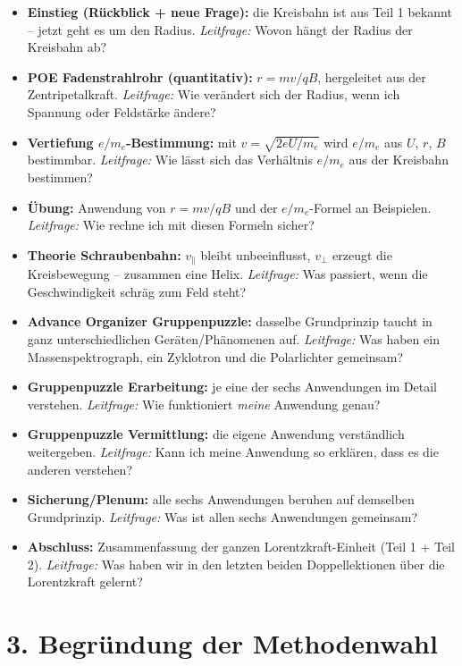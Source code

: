 \documentclass[11pt,a4paper]{article}
\begin{document}
\begin{itemize}[leftmargin=1.3cm,itemsep=0.3em]
  \item \textbf{Einstieg (Rückblick + neue Frage):} die Kreisbahn ist aus
  Teil 1 bekannt -- jetzt geht es um den Radius. \emph{Leitfrage:} Wovon
  hängt der Radius der Kreisbahn ab?
  \item \textbf{POE Fadenstrahlrohr (quantitativ):} $r=mv/qB$, hergeleitet
  aus der Zentripetalkraft. \emph{Leitfrage:} Wie verändert sich der
  Radius, wenn ich Spannung oder Feldstärke ändere?
  \item \textbf{Vertiefung $e/m_e$-Bestimmung:} mit $v=\sqrt{2eU/m_e}$
  wird $e/m_e$ aus $U$, $r$, $B$ bestimmbar. \emph{Leitfrage:} Wie lässt
  sich das Verhältnis $e/m_e$ aus der Kreisbahn bestimmen?
  \item \textbf{Übung:} Anwendung von $r=mv/qB$ und der $e/m_e$-Formel an
  Beispielen. \emph{Leitfrage:} Wie rechne ich mit diesen Formeln sicher?
  \item \textbf{Theorie Schraubenbahn:} $v_\parallel$ bleibt
  unbeeinflusst, $v_\perp$ erzeugt die Kreisbewegung -- zusammen eine
  Helix. \emph{Leitfrage:} Was passiert, wenn die Geschwindigkeit schräg
  zum Feld steht?
  \item \textbf{Advance Organizer Gruppenpuzzle:} dasselbe Grundprinzip
  taucht in ganz unterschiedlichen Geräten/Phänomenen auf.
  \emph{Leitfrage:} Was haben ein Massenspektrograph, ein Zyklotron und
  die Polarlichter gemeinsam?
  \item \textbf{Gruppenpuzzle Erarbeitung:} je eine der sechs Anwendungen
  im Detail verstehen. \emph{Leitfrage:} Wie funktioniert \emph{meine}
  Anwendung genau?
  \item \textbf{Gruppenpuzzle Vermittlung:} die eigene Anwendung
  verständlich weitergeben. \emph{Leitfrage:} Kann ich meine Anwendung so
  erklären, dass es die anderen verstehen?
  \item \textbf{Sicherung/Plenum:} alle sechs Anwendungen beruhen auf
  demselben Grundprinzip. \emph{Leitfrage:} Was ist allen sechs
  Anwendungen gemeinsam?
  \item \textbf{Abschluss:} Zusammenfassung der ganzen
  Lorentzkraft-Einheit (Teil 1 + Teil 2). \emph{Leitfrage:} Was haben wir
  in den letzten beiden Doppellektionen über die Lorentzkraft gelernt?
\end{itemize}

\section*{3. Begründung der Methodenwahl}
\end{document}
